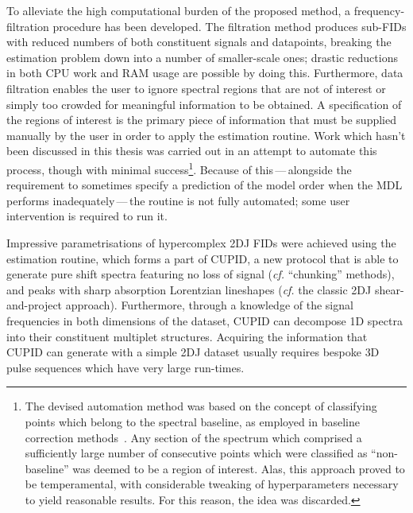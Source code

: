 To alleviate the high computational burden of the proposed method,
a frequency-filtration procedure has been developed. The filtration method
produces sub-\acp{FID} with reduced numbers of both constituent signals and datapoints,
breaking the estimation problem down into a number of smaller-scale ones;
drastic reductions in both \ac{CPU} work and \ac{RAM} usage are possible by
doing this.
Furthermore, data filtration enables the user to ignore spectral regions
that are not of interest or simply too crowded for meaningful information to be
obtained. A specification of the regions of interest is the primary
piece of information that must be supplied manually by the user in order to
apply the estimation routine.
Work which hasn't been discussed in this thesis was carried out in an attempt to
automate this process, though with minimal success\footnote{
    The devised automation method was based on the concept of classifying
    points which belong to the spectral baseline, as employed in baseline
    correction methods~\cite{Dietrich1991}. Any section of the spectrum which
    comprised a sufficiently large number of consecutive points which were
    classified as ``non-baseline'' was deemed to be a region of interest. Alas,
    this approach proved to be temperamental, with considerable tweaking
    of hyperparameters necessary to yield reasonable results. For this reason,
    the idea was discarded.
}. Because of this\,---\,alongside the requirement to sometimes specify a
prediction of the model order when the \ac{MDL} performs inadequately\,---\,the
routine is not fully automated; some user intervention is required to run it.

Impressive parametrisations of hypercomplex \ac{2DJ} \acp{FID} were achieved using
the estimation routine, which forms a part of \ac{CUPID}, a new protocol that
is able to generate pure shift spectra featuring no loss of signal (\textit{cf.}
``chunking'' methods), and peaks with sharp absorption Lorentzian lineshapes
(\textit{cf.} the classic \ac{2DJ} shear-and-project approach).
Furthermore, through a knowledge of the signal frequencies in both dimensions
of the dataset, \ac{CUPID} can decompose \ac{1D} spectra into their constituent
multiplet structures. Acquiring the information that \ac{CUPID} can generate
with a simple \ac{2DJ} dataset usually requires bespoke \ac{3D} pulse sequences
which have very large run-times.

